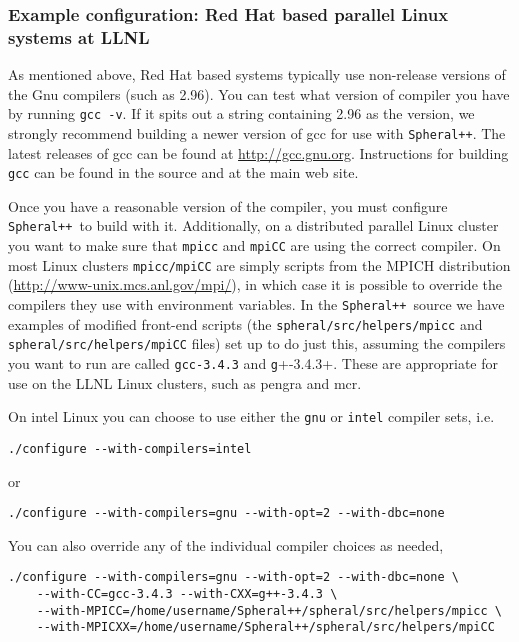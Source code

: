 \documentclass{article}
\newcommand{\Spheral}{{\tt Spheral++}}
\begin{document}
\subsubsection{Example configuration: Red Hat based parallel Linux systems at LLNL}
\label{mcr.sec}

As mentioned above, Red Hat based systems typically use non-release versions of
the Gnu compilers (such as 2.96).  You can test what version of compiler you
have by running \verb+gcc -v+.  If it spits out a string containing 2.96 as the
version, we strongly recommend building a newer version of gcc for use with
\Spheral.  The latest releases of gcc can be found at \url{http://gcc.gnu.org}.
Instructions for building \verb+gcc+ can be found in the source and at the main
web site.

Once you have a reasonable version of the compiler, you must configure
\Spheral\ to build with it.  Additionally, on a distributed parallel Linux
cluster you want to make sure that \verb+mpicc+ and \verb+mpiCC+ are using the
correct compiler.  On most Linux clusters \verb+mpicc/mpiCC+ are simply scripts
from the MPICH distribution (\url{http://www-unix.mcs.anl.gov/mpi/}), in which
case it is possible to override the compilers they use with environment
variables.  In the \Spheral\ source we have examples of modified front-end
scripts (the {\tt spheral/src/helpers/mpicc} and
\verb+spheral/src/helpers/mpiCC+ files) set up to do just this, assuming the
compilers you want to run are called \verb+gcc-3.4.3+ and \verb+g++-3.4.3+.
These are appropriate for use on the LLNL Linux clusters, such as pengra and
mcr.

On intel Linux you can choose to use either the \verb+gnu+ or \verb+intel+
compiler sets, i.e.
\begin{verbatim}
./configure --with-compilers=intel
\end{verbatim}
or
\begin{verbatim}
./configure --with-compilers=gnu --with-opt=2 --with-dbc=none
\end{verbatim}
You can also override any of the individual compiler choices as needed,
\begin{verbatim}
./configure --with-compilers=gnu --with-opt=2 --with-dbc=none \
    --with-CC=gcc-3.4.3 --with-CXX=g++-3.4.3 \
    --with-MPICC=/home/username/Spheral++/spheral/src/helpers/mpicc \
    --with-MPICXX=/home/username/Spheral++/spheral/src/helpers/mpiCC
\end{verbatim}

\end{document}
